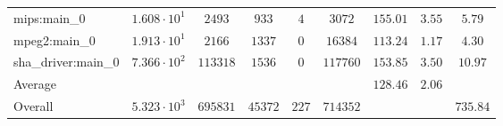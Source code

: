 \begin{tabular}{|l|c|c|c|c|c|c|c|c|}
mips:main\_0            & $ 1.608 \cdot 10^{1}  $ & $ 2493   $ & $ 933   $ & $ 4   $ & $ 3072   $ & $ 155.01      $ & $ 3.55    $ & $ 5.79    $ \\
mpeg2:main\_0           & $ 1.913 \cdot 10^{1}  $ & $ 2166   $ & $ 1337  $ & $ 0   $ & $ 16384  $ & $ 113.24      $ & $ 1.17    $ & $ 4.30    $ \\
sha\_driver:main\_0     & $ 7.366 \cdot 10^{2}  $ & $ 113318 $ & $ 1536  $ & $ 0   $ & $ 117760 $ & $ 153.85      $ & $ 3.50    $ & $ 10.97   $ \\
\hline
Average                 & $                     $ & $        $ & $       $ & $     $ & $        $ & $ 128.46      $ & $ 2.06    $ & $         $ \\
\hline
Overall                 & $ 5.323 \cdot 10^{3}  $ & $ 695831 $ & $ 45372 $ & $ 227 $ & $ 714352 $ & $             $ & $         $ & $ 735.84  $ \\
\hline
\end{tabular}
